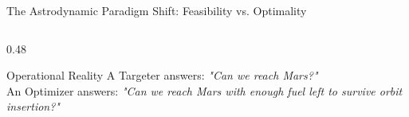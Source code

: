 \documentclass[aspectratio=169, 10pt]{beamer}
\begin{document}
\begin{frame}{The Astrodynamic Paradigm Shift: Feasibility vs. Optimality}
\begin{columns}[t]
\begin{column}{0.48\textwidth}
            \vspace{-0.1cm}

            \begin{alertblock}{Operational Reality}
                \scriptsize
                A Targeter answers: \textit{"Can we reach Mars?"} \\
                An Optimizer answers: \textit{"Can we reach Mars with enough fuel left to survive orbit insertion?"}
            \end{alertblock}
        \end{column}
    \end{columns}
\end{frame}

\end{document}
